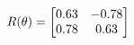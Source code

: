 \documentclass[preview]{standalone}
\begin{document}
\begin{align*}
\special{dvisvgm:raw <g id='unique000'>}R(\theta) = \begin{bmatrix}0.63 & -0.78\\0.78 & 0.63\end{bmatrix}\special{dvisvgm:raw </g>}
\end{align*}
\end{document}

